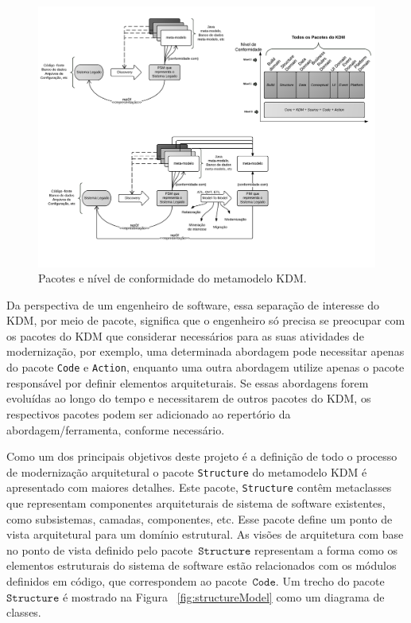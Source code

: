\documentclass[12pt]{article}
\begin{document}
\begin{figure}[htb]
 \centering
 \includegraphics[scale=1]{kdmLevels_pacotes.pdf}
 \caption{Pacotes e nível de conformidade do metamodelo KDM.}
 \label{kdm:domain}
\end{figure}

Da perspectiva de um engenheiro de software, essa separação de interesse do KDM, por meio de pacote, significa que o engenheiro só precisa se preocupar com os pacotes do KDM que considerar necessários para as suas atividades de modernização, por exemplo, uma determinada abordagem pode necessitar apenas do pacote \texttt{Code} e \texttt{Action}, enquanto uma outra abordagem utilize apenas o pacote responsável por definir elementos arquiteturais. Se essas abordagens forem evoluídas ao longo do tempo e necessitarem de outros pacotes do KDM, os respectivos pacotes podem ser adicionado ao repertório da abordagem/ferramenta, conforme necessário.

Como um dos principais objetivos deste projeto é a definição de todo o processo de modernização arquitetural o pacote \texttt{Structure} do metamodelo KDM é apresentado com maiores detalhes. Este pacote, \texttt{Structure} contêm metaclasses que representam componentes arquiteturais de sistema de software existentes, como subsistemas, camadas, componentes, etc. Esse pacote define um ponto de vista arquitetural para um domínio estrutural. As visões de arquitetura com base no ponto de vista definido pelo pacote~$\mathtt{Structure}$ representam a forma como os elementos estruturais do sistema de software estão relacionados com os módulos definidos em código, que correspondem ao pacote~$\mathtt{Code}$. Um trecho do pacote~$\mathtt{Structure}$ é mostrado na Figura ~\ref{fig:structureModel} como um diagrama de classes.
\end{document}

